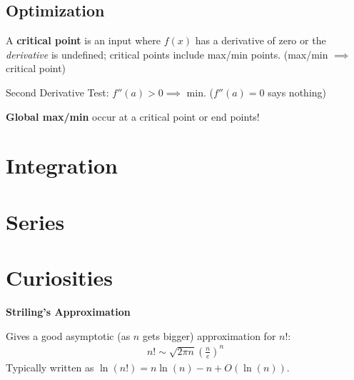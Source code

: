 \documentclass[a4paper, 12pt]{article}
\newcommand{\bt}[1]{\textbf{#1}} %
\newcommand{\eq}[1]{\begin{align*}#1\end{align*}} %
\renewcommand{\eq}[1]{\begin{align*}#1\end{align*}} %
\begin{document}
\subsection*{Optimization}

A \bt{critical point} is an input where $f(x)$ has a derivative of zero or the \textit{derivative} is undefined; critical points include max/min points.
(max/min $\implies$ critical point)

Second Derivative Test: $f''(a) > 0 \implies$ min. ($f''(a) =0$ says nothing)

\bt{Global max/min} occur at a critical point or end points!
\section{Integration}

\section{Series}

\section*{Curiosities}

\bt{Striling's Approximation}

Gives a good asymptotic (as $n$ gets bigger) approximation for $n!$:\\

\eq{
n! \sim \sqrt{2\pi n} (\frac{n}{e})^n
}
Typically written as $\ln(n!) = n\ln(n) - n + O(\ln(n))$. 
\end{document}
